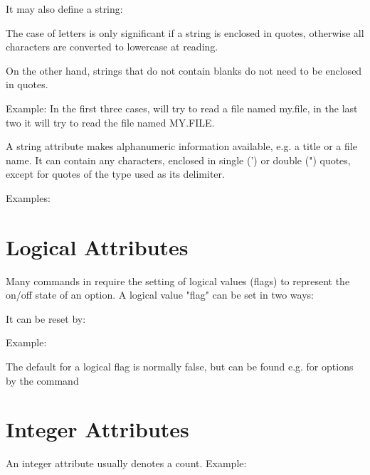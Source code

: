 It may also define a string: 

The case of letters is only significant if a string is enclosed in
quotes, otherwise all characters are converted to lowercase at
reading. 

On the other hand, strings that do not contain blanks do not
need to be enclosed in quotes.

Example:
In the first three cases, \madx will try to read a file named my.file, in the
last two it will try to read the file named MY.FILE.  



A string attribute makes alphanumeric information available, e.g. a
title or a file name. It can contain any characters, enclosed in single
(') or double (") quotes, except for quotes of the type used as its
delimiter.  

Examples: 


\section{Logical Attributes}
\label{sec:logical}
Many commands in \madx require the setting of logical values (flags) to
represent the on/off state of an option. A logical value "flag" can be
set in two ways:  

It can be reset by: 

Example: 

The default for a logical flag is normally false, but can be found e.g. for options by the command  


\section{Integer Attributes}
\label{sec:integer}
An integer attribute usually denotes a count. Example: 

